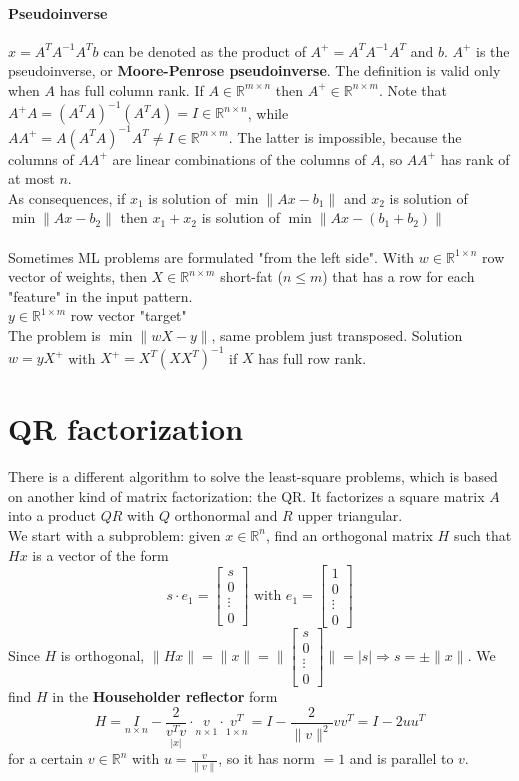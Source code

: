 \documentclass[10pt]{report}
\begin{document}
\paragraph{Pseudoinverse} $x = A^TA^{-1}A^Tb$ can be denoted as the product of $A^+ = A^TA^{-1}A^T$ and $b$. $A^+$ is the pseudoinverse, or \textbf{Moore-Penrose pseudoinverse}. The definition is valid only when $A$ has full column rank. If $A\in \mathbb{R}^{m\times n}$ then $A^+ \in \mathbb{R}^{n\times m}$. Note that $A^+A = (A^TA)^{-1}(A^TA) = I\in \mathbb{R}^{n\times n}$, while $AA^+ = A(A^TA)^{-1}A^T \neq I\in \mathbb{R}^{m\times m}$. The latter is impossible, because the columns of $AA^+$ are linear combinations of the columns of $A$, so $AA^+$ has rank of at most $n$.\\
As consequences, if $x_1$ is solution of $\min\|Ax - b_1\|$ and $x_2$ is solution of $\min\|Ax - b_2\|$ then $x_1+x_2$ is solution of $\min\|Ax - (b_1 + b_2)\|$\\\\Sometimes ML problems are formulated "from the left side". With $w\in \mathbb{R}^{1\times n}$ row vector of weights, then $X\in \mathbb{R}^{n\times m}$ short-fat ($n\leq m$) that has a row for each "feature" in the input pattern.\\
$y \in \mathbb{R}^{1\times m}$ row vector "target"\\
The problem is $\min\|wX - y\|$, same problem just transposed. Solution $w = yX^+$ with $X^+ = X^T(XX^T)^{-1}$ if $X$ has full row rank.
\pagebreak
\section{QR factorization}
There is a different algorithm to solve the least-square problems, which is based on another kind of matrix factorization: the QR. It factorizes a square matrix $A$ into a product $QR$ with $Q$ orthonormal and $R$ upper triangular.\\
We start with a subproblem: given $x\in \mathbb{R}^n$, find an orthogonal matrix $H$ such that $Hx$ is a vector of the form $$s\cdot e_1 = \left[\begin{array}{c}
s\\0\\\vdots\\0
\end{array}\right]\text{ with }e_1 = \left[\begin{array}{c}
1\\0\\\vdots\\0
\end{array}\right]$$
Since $H$ is orthogonal, $\|Hx\| = \|x\| = \|\left[\begin{array}{c}
s\\0\\\vdots\\0
\end{array}\right]\| = |s| \Rightarrow s = \pm\|x\|$. We find $H$ in the \textbf{Householder reflector} form $$H = \underset{n\times n}{I} - \underset{|x|}{\frac{2}{v^Tv}}\cdot\underset{n\times 1}{v}\cdot\underset{1\times n}{v^T}= I - \frac{2}{\|v\|^2}vv^T = I - 2uu^T$$ for a certain $v\in \mathbb{R}^n$ with $u = \frac{v}{\|v\|}$, so it has norm $=1$ and is parallel to $v$.
\end{document}
